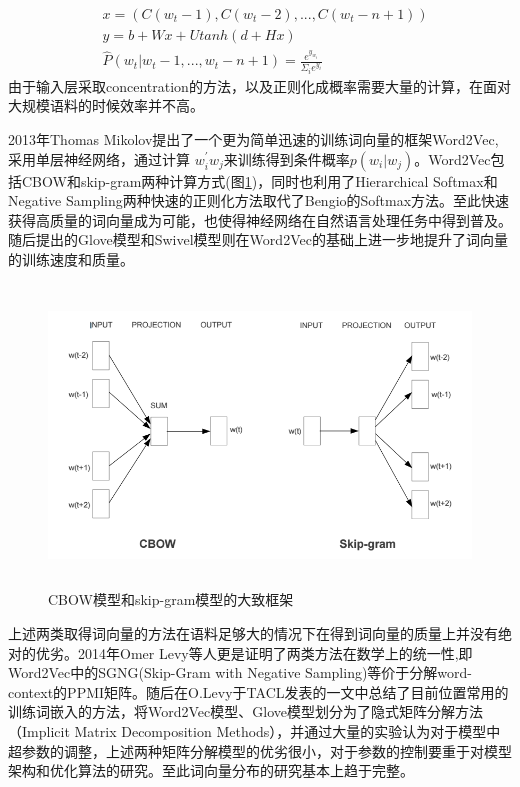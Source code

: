 \documentclass[13pt]{article}
\begin{document}
\begin{align*}
&x=(C(w_t-1),C(w_t-2),...,C(w_t-n+1))\\
&y=b+Wx+Utanh(d+Hx)\\
&\hat{P}(w_t|w_t-1,...,w_t-n+1)=\frac{e^{y_{w_t}}}{\Sigma_{i}e^{y_i}}
\end{align*}
由于输入层采取concentration的方法，以及正则化成概率需要大量的计算，在面对大规模语料的时候效率并不高。

2013年Thomas Mikolov提出了一个更为简单迅速的训练词向量的框架Word2Vec\cite{mikolov2013efficient},采用单层神经网络，通过计算
$w_i^{\prime{}}w_j$来训练得到条件概率$p(w_i|w_j)$。Word2Vec包括CBOW和skip-gram两种计算方式(图\ref{fig:w2v})，同时也利用了Hierarchical Softmax和Negative Sampling两种快速的正则化方法取代了Bengio的Softmax方法。至此快速获得高质量的词向量成为可能，也使得神经网络在自然语言处理任务中得到普及。随后提出的Glove模型\cite{pennington2014glove}和Swivel模型\cite{shazeer2016swivel}则在Word2Vec的基础上进一步地提升了词向量的训练速度和质量。
\begin{figure}[h]
\includegraphics[width=\textwidth,height=8cm]{aaa.jpg}
\caption{CBOW模型和skip-gram模型的大致框架}
\centering
\label{fig:w2v}
\end{figure}

上述两类取得词向量的方法在语料足够大的情况下在得到词向量的质量上并没有绝对的优劣。2014年Omer Levy等人更是证明了两类方法在数学上的统一性\cite{levy2014neural},即Word2Vec中的SGNG(Skip-Gram with Negative Sampling)等价于分解word-context的PPMI矩阵。随后在O.Levy于TACL发表的\cite{levy2015improving}一文中总结了目前位置常用的训练词嵌入的方法，将Word2Vec模型、Glove模型划分为了隐式矩阵分解方法（Implicit Matrix Decomposition Methods），并通过大量的实验认为对于模型中超参数的调整，上述两种矩阵分解模型的优劣很小，对于参数的控制要重于对模型架构和优化算法的研究。至此词向量分布的研究基本上趋于完整。
\end{document}
